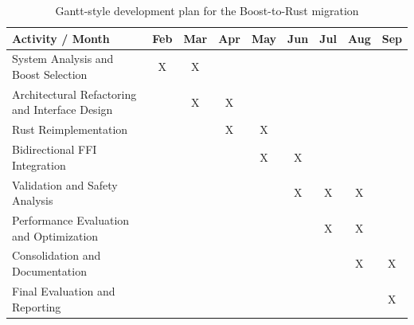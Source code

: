 \begin{table}[H]

\centering

\renewcommand{\arraystretch}{1.3}

\begin{tabular}{|l|c|c|c|c|c|c|c|c|}

\hline

\textbf{Activity / Month} &
\textbf{Feb} &
\textbf{Mar} &
\textbf{Apr} &
\textbf{May} &
\textbf{Jun} &
\textbf{Jul} &
\textbf{Aug} &
\textbf{Sep} \\ \hline

System Analysis and Boost Selection
    & X & X &   &   &   &   &   &   \\ \hline

Architectural Refactoring and Interface Design
    &   & X & X &   &   &   &   &   \\ \hline

Rust Reimplementation
    &   &   & X & X &   &   &   &   \\ \hline

Bidirectional \gls{FFI} Integration
    &   &   &   & X & X &   &   &   \\ \hline

Validation and Safety Analysis
    &   &   &   &   & X & X & X &   \\ \hline

Performance Evaluation and Optimization
    &   &   &   &   &   & X & X &   \\ \hline

Consolidation and Documentation
    &   &   &   &   &   &   & X & X \\ \hline

Final Evaluation and Reporting
    &   &   &   &   &   &   &   & X \\ \hline

\end{tabular}

\caption{Gantt-style development plan for the Boost-to-Rust migration}

\label{tab:development_gantt}

\end{table}

